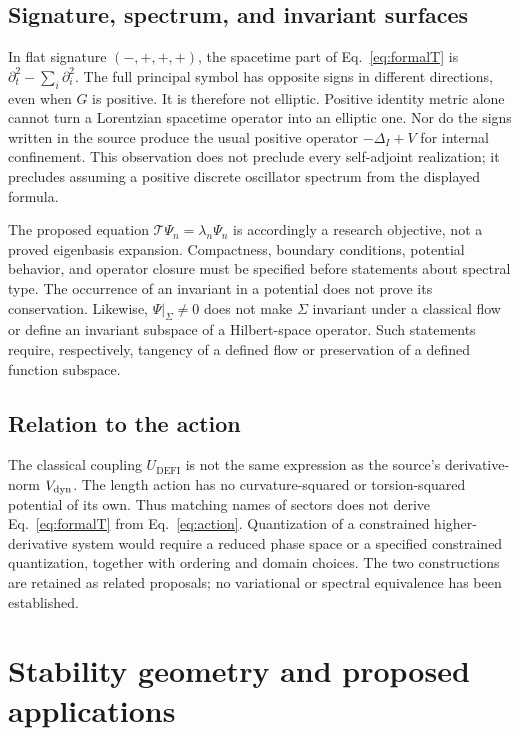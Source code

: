 \documentclass[aip,jmp,reprint,onecolumn,amsmath,amssymb]{revtex4-2}
\newcommand{\U}{U_{\mathrm{DEFI}}}
\begin{document}
\subsection{Signature, spectrum, and invariant surfaces}
In flat signature $(-,+,+,+)$, the spacetime part of Eq.~\eqref{eq:formalT} is $\partial_t^2-\sum_i\partial_i^2$. The full principal symbol has opposite signs in different directions, even when $G$ is positive. It is therefore not elliptic. Positive identity metric alone cannot turn a Lorentzian spacetime operator into an elliptic one. Nor do the signs written in the source produce the usual positive operator $-\Delta_I+V$ for internal confinement. This observation does not preclude every self-adjoint realization; it precludes assuming a positive discrete oscillator spectrum from the displayed formula.

The proposed equation $\mathcal T\Psi_n=\lambda_n\Psi_n$ is accordingly a research objective, not a proved eigenbasis expansion. Compactness, boundary conditions, potential behavior, and operator closure must be specified before statements about spectral type. The occurrence of an invariant in a potential does not prove its conservation. Likewise, $\Psi|_\Sigma\ne0$ does not make $\Sigma$ invariant under a classical flow or define an invariant subspace of a Hilbert-space operator. Such statements require, respectively, tangency of a defined flow or preservation of a defined function subspace.

\subsection{Relation to the action}
The classical coupling $\U$ is not the same expression as the source's derivative-norm $V_{\rm dyn}$. The length action has no curvature-squared or torsion-squared potential of its own. Thus matching names of sectors does not derive Eq.~\eqref{eq:formalT} from Eq.~\eqref{eq:action}. Quantization of a constrained higher-derivative system would require a reduced phase space or a specified constrained quantization, together with ordering and domain choices. The two constructions are retained as related proposals; no variational or spectral equivalence has been established.

\section{Stability geometry and proposed applications}
\end{document}
